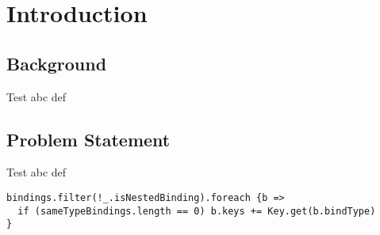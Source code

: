 
\chapter{Introduction}
\label{introduction}

\section{Background}

Test abc def

\section{Problem Statement}
\label{problem_statement}

Test abc def

\begin{lstlisting}
bindings.filter(!_.isNestedBinding).foreach {b =>
  if (sameTypeBindings.length == 0) b.keys += Key.get(b.bindType)
}
\end{lstlisting}



